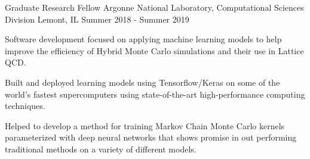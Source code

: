 \vspace{-1.75ex}

\begin{cventries}

\cventry
  {Graduate Research Fellow} %
  {Argonne National Laboratory, Computational Sciences Division} %
  {Lemont, IL} %
  {Summer 2018 - Summer 2019} %
  {
      \begin{cvitems} %
          \item {Software development focused on applying machine learning
                  models to help improve the efficiency of Hybrid Monte Carlo 
                simulations and their use in Lattice QCD.}
          \item {Built and deployed learning models using Tensorflow/Keras 
                  on some of the world's fastest supercomputers using 
                  state-of-the-art high-performance computing techniques.}
          \item {Helped to develop a method for training Markov Chain Monte
                  Carlo kernels parameterized with deep neural networks that
                  shows promise in out performing traditional methods on a
                  variety of different models.}
      \end{cvitems}
  }


\end{cventries}
